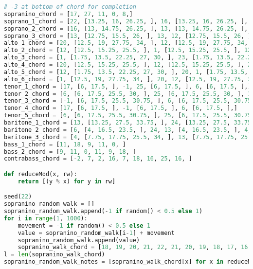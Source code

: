 \begin{lstlisting}[language=Python, caption=Invocation Source Code]
# -3 at bottom of chord for completion
sopranino_chord = [17, 27, 11, 0, 8,]
soprano_1_chord = [22, [13.25, 16, 26.25, ], 16, [13.25, 16, 26.25, ], [13.25, 16, 26.25, ], ]
soprano_2_chord = [16, [13, 14.75, 26.25, ], 13, [13, 14.75, 26.25, ], 14, [13, 14.75, 26.25, ], 13, [13, 14.75, 26.25, ], ]
soprano_3_chord = [13, [12.75, 15.5, 26, ], 13, 12, [12.75, 15.5, 26, ], 16, [12.75, 15.5, 26, ], 12, ]
alto_1_chord = [20, [12.5, 19, 27.75, 34, ], 12, [12.5, 19, 27.75, 34, ], 23, ]
alto_2_chord = [12, [12.5, 15.25, 25.5, ], 1, [12.5, 15.25, 25.5, ], 12, [12.5, 15.25, 25.5, ], 23, ]
alto_3_chord = [1, [1.75, 13.5, 22.25, 27, 30, ], 23, [1.75, 13.5, 22.25, 27, 30, ], 1, [1.75, 13.5, 22.25, 27, 30, ], 12, [1.75, 13.5, 22.25, 27, 30, ], ]
alto_4_chord = [20, [12.5, 15.25, 25.5, ], 12, [12.5, 15.25, 25.5, ], 20, [12.5, 15.25, 25.5, ], 23, ]
alto_5_chord = [12, [1.75, 13.5, 22.25, 27, 30, ], 20, 1, [1.75, 13.5, 22.25, 27, 30, ], 23, [1.75, 13.5, 22.25, 27, 30, ], ]
alto_6_chord = [1, [12.5, 19, 27.75, 34, ], 20, 12, [12.5, 19, 27.75, 34, ], ]
tenor_1_chord = [17, [6, 17.5, ], -1, 25, [6, 17.5, ], 6, [6, 17.5, ],]
tenor_2_chord = [6, [6, 17.5, 25.5, 30, ], 25, [6, 17.5, 25.5, 30, ], 17,]
tenor_3_chord = [-1, [6, 17.5, 25.5, 30.75, ], 6, [6, 17.5, 25.5, 30.75, ], 17, [6, 17.5, 25.5, 30.75, ], 25, [6, 17.5, 25.5, 30.75, ], ]
tenor_4_chord = [17, [6, 17.5, ], -1, [6, 17.5, ], 6, [6, 17.5, ],]
tenor_5_chord = [6, [6, 17.5, 25.5, 30.75, ], 25, [6, 17.5, 25.5, 30.75, ], 17, [6, 17.5, 25.5, 30.75, ], ]
baritone_1_chord = [13, [13.25, 27.5, 33.75, ], 24, [13.25, 27.5, 33.75, ], 13, [13.25, 27.5, 33.75, ], 6, [13.25, 27.5, 33.75, ],]
baritone_2_chord = [6, [4, 16.5, 23.5, ], 24, 13, [4, 16.5, 23.5, ], 4, ]
baritone_3_chord = [4, [7.75, 17.75, 25.5, 34, ], 13, [7.75, 17.75, 25.5, 34, ], 6, [7.75, 17.75, 25.5, 34, ], 24, [7.75, 17.75, 25.5, 34, ], ]
bass_1_chord = [11, 18, 9, 11, 0, ]
bass_2_chord = [9, 11, 0, 11, 9, 18, ]
contrabass_chord = [-2, 7, 2, 16, 7, 18, 16, 25, 16, ]

def reduceMod(x, rw):
    return [(y % x) for y in rw]

seed(22)
sopranino_random_walk = []
sopranino_random_walk.append(-1 if random() < 0.5 else 1)
for i in range(1, 1000):
    movement = -1 if random() < 0.5 else 1
    value = sopranino_random_walk[i-1] + movement
    sopranino_random_walk.append(value)
    sopranino_walk_chord = [18, 19, 20, 21, 22, 21, 20, 19, 18, 17, 16, 15, 14, 13, 12, 11, 10, 9, 8, 7, 6, 5, 4, 3, 2, 1, 0, -1, -2, -1, 0, 1, 2, 3, 4, 5, 6, 7, 8, 9, 10, 11, 12, 13, 14, 15, 16, 17, ]
l = len(sopranino_walk_chord)
sopranino_random_walk_notes = [sopranino_walk_chord[x] for x in reduceMod(l, sopranino_random_walk)]


\end{lstlisting}
